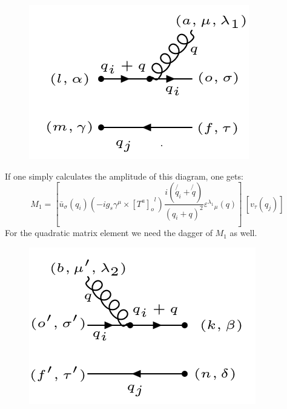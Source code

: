 \begin{figure}[h!]
\centering
\includegraphics[scale=0.7]{images/QQ/qgqbarM.png}
\end{figure}
If one simply calculates the amplitude of this diagram, one gets:
\begin{equation}
M_1 = [{\bar{u}}_{\sigma}(q_i) (-ig_s \gamma^{\mu}\times {[T^a]_o}^l)  \frac{i(\not{q_i} + \not{q})}{(q_i + q)^2} {\varepsilon^{\lambda_1}}_{\mu} (q)]\: [{v}_{\tau}(q_j)]
\end{equation}
For the quadratic matrix element we need the dagger of $ M_1 $ as well.
\begin{figure}[h!]
\centering
\includegraphics[scale=0.7]{images/QQ/qgqbarMDega.png}
\end{figure}

